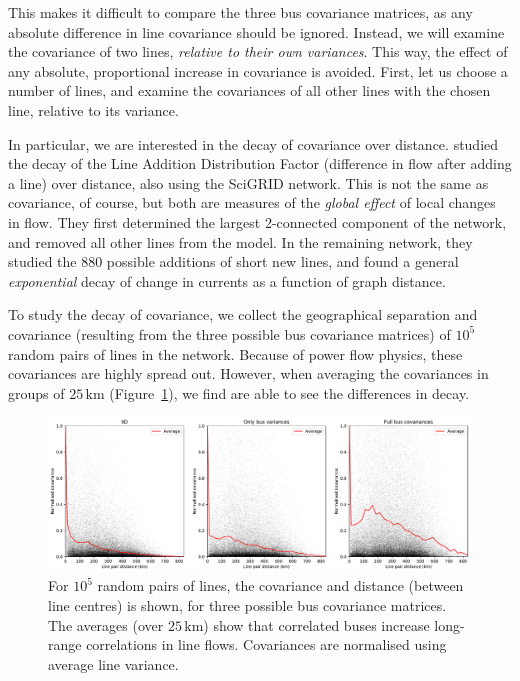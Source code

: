 \documentclass[main.tex]{subfiles}
\begin{document}
This makes it difficult to compare the three bus covariance matrices, as any absolute difference in line covariance should be ignored. Instead, we will examine the covariance of two lines, \emph{relative to their own variances}. This way, the effect of any absolute, proportional increase in covariance is avoided. First, let us choose a number of lines, and examine the covariances of all other lines with the chosen line, relative to its variance. 

In particular, we are interested in the decay of covariance over distance. \cite{Jung2016} studied the decay of the Line Addition Distribution Factor (difference in flow after adding a line) over distance, also using the SciGRID network. This is not the same as covariance, of course, but both are measures of the \emph{global effect} of local changes in flow. They first determined the largest 2-connected component of the network, and removed all other lines from the model. In the remaining network, they studied the 880 possible additions of short new lines, and found a general \emph{exponential} decay of change in currents as a function of graph distance.

To study the decay of covariance, we collect the geographical separation and covariance (resulting from the three possible bus covariance matrices) of $10^5$ random pairs of lines in the network. Because of power flow physics, these covariances are highly spread out. However, when averaging the covariances in groups of $25 \, \si{\kilo\metre}$ (Figure~\ref{fig:linecovdecay}), we find are able to see the differences in decay. 

\begin{figure}
\centering
\includegraphics[width=\textwidth]{img/covariance_linepairs_with_average.pdf}
\caption{\label{fig:linecovdecay} For $10^5$ random pairs of lines, the covariance and distance (between line centres) is shown, for three possible bus covariance matrices. The averages (over $25 \, \si{\kilo\metre}$) show that correlated buses increase long-range correlations in line flows. Covariances are normalised using average line variance.}
\end{figure}
\end{document}
